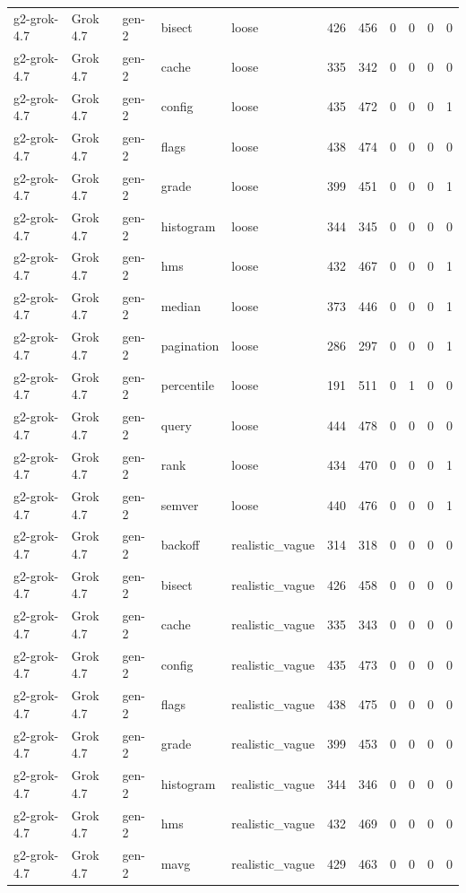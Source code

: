 \begin{tabular}{lllllllllll}
g2-grok-4.7 & Grok 4.7 & gen-2 & bisect & loose & 426 & 456 & 0 & 0 & 0 & 0 \\
g2-grok-4.7 & Grok 4.7 & gen-2 & cache & loose & 335 & 342 & 0 & 0 & 0 & 0 \\
g2-grok-4.7 & Grok 4.7 & gen-2 & config & loose & 435 & 472 & 0 & 0 & 0 & 1 \\
g2-grok-4.7 & Grok 4.7 & gen-2 & flags & loose & 438 & 474 & 0 & 0 & 0 & 0 \\
g2-grok-4.7 & Grok 4.7 & gen-2 & grade & loose & 399 & 451 & 0 & 0 & 0 & 1 \\
g2-grok-4.7 & Grok 4.7 & gen-2 & histogram & loose & 344 & 345 & 0 & 0 & 0 & 0 \\
g2-grok-4.7 & Grok 4.7 & gen-2 & hms & loose & 432 & 467 & 0 & 0 & 0 & 1 \\
g2-grok-4.7 & Grok 4.7 & gen-2 & median & loose & 373 & 446 & 0 & 0 & 0 & 1 \\
g2-grok-4.7 & Grok 4.7 & gen-2 & pagination & loose & 286 & 297 & 0 & 0 & 0 & 1 \\
g2-grok-4.7 & Grok 4.7 & gen-2 & percentile & loose & 191 & 511 & 0 & 1 & 0 & 0 \\
g2-grok-4.7 & Grok 4.7 & gen-2 & query & loose & 444 & 478 & 0 & 0 & 0 & 0 \\
g2-grok-4.7 & Grok 4.7 & gen-2 & rank & loose & 434 & 470 & 0 & 0 & 0 & 1 \\
g2-grok-4.7 & Grok 4.7 & gen-2 & semver & loose & 440 & 476 & 0 & 0 & 0 & 1 \\
g2-grok-4.7 & Grok 4.7 & gen-2 & backoff & realistic\_vague & 314 & 318 & 0 & 0 & 0 & 0 \\
g2-grok-4.7 & Grok 4.7 & gen-2 & bisect & realistic\_vague & 426 & 458 & 0 & 0 & 0 & 0 \\
g2-grok-4.7 & Grok 4.7 & gen-2 & cache & realistic\_vague & 335 & 343 & 0 & 0 & 0 & 0 \\
g2-grok-4.7 & Grok 4.7 & gen-2 & config & realistic\_vague & 435 & 473 & 0 & 0 & 0 & 0 \\
g2-grok-4.7 & Grok 4.7 & gen-2 & flags & realistic\_vague & 438 & 475 & 0 & 0 & 0 & 0 \\
g2-grok-4.7 & Grok 4.7 & gen-2 & grade & realistic\_vague & 399 & 453 & 0 & 0 & 0 & 0 \\
g2-grok-4.7 & Grok 4.7 & gen-2 & histogram & realistic\_vague & 344 & 346 & 0 & 0 & 0 & 0 \\
g2-grok-4.7 & Grok 4.7 & gen-2 & hms & realistic\_vague & 432 & 469 & 0 & 0 & 0 & 0 \\
g2-grok-4.7 & Grok 4.7 & gen-2 & mavg & realistic\_vague & 429 & 463 & 0 & 0 & 0 & 0 \\

\end{tabular}

